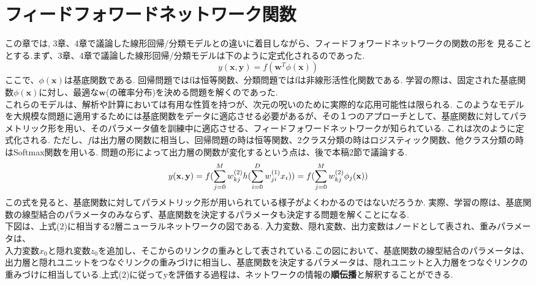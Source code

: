 \documentclass[11pt,a4paper]{jsarticle}
\begin{document}
\section{フィードフォワードネットワーク関数}
この章では, 3章、4章で議論した線形回帰/分類モデルとの違いに着目しながら、フィードフォワードネットワークの関数の形を
見ることとする.まず、3章、4章で議論した線形回帰/分類モデルは下のように定式化されるのであった.\\
\begin{equation}
  y(\textbf{x}, \textbf{y}) = f(\textbf{w}^T \phi(\textbf{x}))
\end{equation}
ここで、$\phi(\textbf{x})$は基底関数である. 回帰問題ではfは恒等関数、分類問題ではfは非線形活性化関数である. 学習の際は、固定された基底関数$\phi(\textbf{x})$に対し、最適な$\textbf{w}$(の確率分布)を決める問題を解くのであった.\\これらのモデルは、解析や計算においては有用な性質を持つが、次元の呪いのために実際的な応用可能性は限られる. このようなモデルを大規模な問題に適用するためには基底関数をデータに適応させる必要があるが、その１つのアプローチとして、基底関数に対してパラメトリック形を用い、そのパラメータ値を訓練中に適応させる、フィードフォワードネットワークが知られている. これは次のように定式化される. ただし、$f$は出力層の関数に相当し、回帰問題の時は恒等関数、2クラス分類の時はロジスティック関数、他クラス分類の時はSoftmax関数を用いる. 問題の形によって出力層の関数が変化するという点は、後で本稿2節で議論する.\\
\begin{equation}
  y(\textbf{x}, \textbf{y}) = f(\sum_{j=0}^M w_{kj} ^{(2)} h(\sum_{i=0}^D w_{ji}^{(1)}x_i))\\
                            = f(\sum_{j=0}^M w_{kj} ^{(2)} \phi_j(\textbf{x}))
\end{equation}
この式を見ると、基底関数に対してパラメトリック形が用いられている様子がよくわかるのではないだろうか. 実際、学習の際は、基底関数の線型結合のパラメータのみならず、基底関数を決定するパラメータも決定する問題を解くことになる. \\
下図は、上式(2)に相当する2層ニューラルネットワークの図である. 入力変数、隠れ変数、出力変数はノードとして表され、重みパラメータは、$入力変数x_0と隠れ変数z_0を追加し、そこからのリンクの重みとして表されている.この図において、基底関数の線型結合のパラメータは、$出力層と隠れユニットをつなぐリンクの重みづけに相当し、基底関数を決定するパラメータは、隠れユニットと入力層をつなぐリンクの重みづけに相当している.上式(2)に従ってyを評価する過程は、ネットワークの情報の\textbf{順伝播}と解釈することができる.\\
\end{document}
